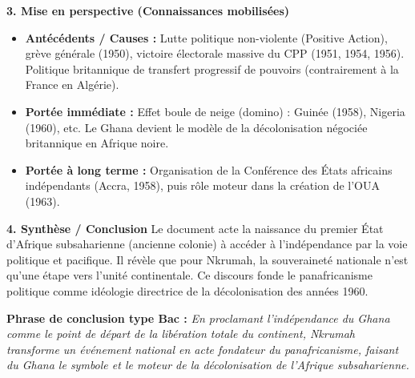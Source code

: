 \documentclass[11pt]{article}
\newcommand{\cle}[1]{{\popxbold\color{popdark}#1}}
\begin{document}
\begin{exoresolu}
\textbf{3. Mise en perspective (Connaissances mobilisées)}
\begin{itemize}
    \item \textbf{Antécédents / Causes :} Lutte politique non-violente (\cle{Positive Action}), grève générale (1950), victoire électorale massive du CPP (1951, 1954, 1956). Politique britannique de \cle{transfert progressif de pouvoirs} (contrairement à la France en Algérie).
    \item \textbf{Portée immédiate :} Effet \cle{boule de neige} (domino) : Guinée (1958), Nigeria (1960), etc. Le Ghana devient le \cle{modèle de la décolonisation négociée} britannique en Afrique noire.
    \item \textbf{Portée à long terme :} Organisation de la \cle{Conférence des États africains indépendants} (Accra, 1958), puis rôle moteur dans la création de l'\cle{OUA} (1963).
\end{itemize}

\textbf{4. Synthèse / Conclusion}
Le document acte la naissance du premier État d'Afrique subsaharienne (ancienne colonie) à accéder à l'indépendance par la voie politique et pacifique. Il révèle que pour Nkrumah, la souveraineté nationale n'est qu'une \cle{étape} vers l'unité continentale. Ce discours fonde le \cle{panafricanisme politique} comme idéologie directrice de la décolonisation des années 1960.

\par \textbf{Phrase de conclusion type Bac :} \emph{En proclamant l'indépendance du Ghana comme le point de départ de la libération totale du continent, Nkrumah transforme un événement national en acte fondateur du panafricanisme, faisant du Ghana le symbole et le moteur de la décolonisation de l'Afrique subsaharienne.}
\end{exoresolu}
\end{document}
